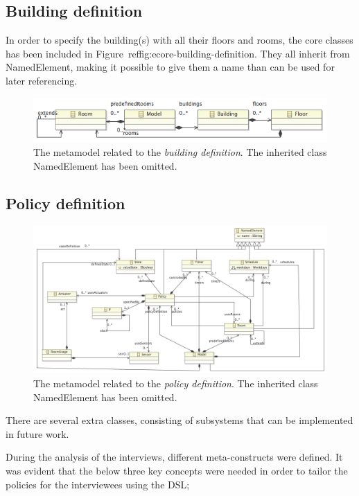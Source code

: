 \documentclass{llncs}
\begin{document}
\pagebreak
\subsection{Building definition}
In order to specify the building(s) with all their floors and rooms, the core classes has been included in Figure ref{fig:ecore-building-definition}. They all inherit from NamedElement, making it possible to give them a name than can be used for later referencing.
\begin{figure}
  \centering \includegraphics[scale=0.4]{ecore-building-definition.png}  
	\caption{The metamodel related to the \textit{building definition}. The inherited class NamedElement has been omitted.}
	\label{fig:ecore-building-definition}
\end{figure}

\subsection{Policy definition}

\begin{figure}
  \centering
    \includegraphics[scale=0.3]{ecore-policy-definition.png}	
	\caption{The metamodel related to the \textit{policy definition}. The inherited class NamedElement has been omitted.}
	\label{fig:ecore-policy-definition}
\end{figure}

\pagebreak
There are several extra classes, consisting of subsystems that can be implemented in future work.

During the analysis of the interviews, different meta-constructs were defined. It was evident that the below three key concepts were needed in order to tailor the policies for the interviewees using the DSL;
\end{document}
